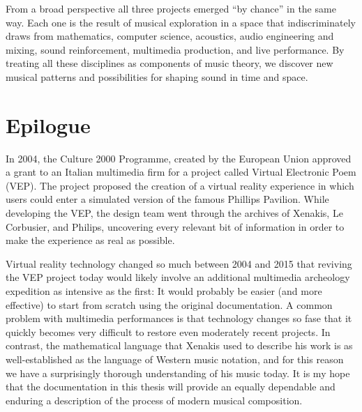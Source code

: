 From a broad perspective all three projects emerged ``by chance'' in
the same way. Each one is the result of musical exploration in a space
that indiscriminately draws from mathematics, computer science,
acoustics, audio engineering and mixing, sound reinforcement,
multimedia production, and live performance. By treating all these
disciplines as components of music theory, we discover new musical
patterns and possibilities for shaping sound in time and space.


\clearpage
\chapter*{Epilogue}
\label{ch:epilogue}

In 2004, the Culture 2000 Programme, created by the European Union
approved a grant to an Italian multimedia firm for a project called
Virtual Electronic Poem (VEP).\cite{eu2004} The project proposed the
creation of a virtual reality experience in which users could enter a
simulated version of the famous Phillips Pavilion. While developing
the VEP, the design team went through the archives of Xenakis, Le
Corbusier, and Philips, uncovering every relevant bit of information
in order to make the experience as real as
possible.\cite{Lombardo2009}

Virtual reality technology changed so much between 2004 and 2015 that
reviving the VEP project today would likely involve an additional
multimedia archeology expedition as intensive as the first: It would
probably be easier (and more effective) to start from scratch using
the original documentation. A common problem with multimedia
performances is that technology changes so fase that it quickly
becomes very difficult to restore even moderately recent
projects.\cite{Lombardo2006} In contrast, the mathematical language
that Xenakis used to describe his work is as well-established as the
language of Western music notation, and for this reason we have a
surprisingly thorough understanding of his music today. It is my hope
that the documentation in this thesis will provide an equally
dependable and enduring a description of the process of modern musical
composition.



